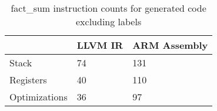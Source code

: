 \begin{table}[h!]
\centering
\begin{tabular}{p{}p{}p{}}
  \hline
 & LLVM IR & ARM Assembly \\ 
  \hline
Stack &  74 & 131 \\ 
  Registers &  40 & 110 \\ 
  Optimizations &  36 &  97 \\ 
   \hline
\end{tabular}
\caption{fact\_sum instruction counts for generated code excluding labels}
\end{table}

